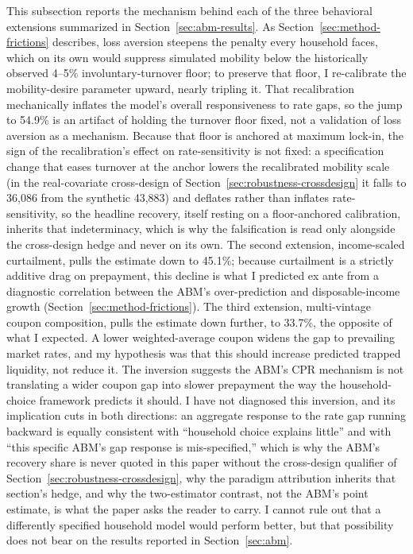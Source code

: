 \documentclass[12pt]{article}
\begin{document}
This subsection reports the mechanism behind each of the three behavioral extensions summarized in Section~\ref{sec:abm-results}. As Section~\ref{sec:method-frictions} describes, loss aversion steepens the penalty every household faces, which on its own would suppress simulated mobility below the historically observed 4--5\% involuntary-turnover floor; to preserve that floor, I re-calibrate the mobility-desire parameter upward, nearly tripling it. That recalibration mechanically inflates the model's overall responsiveness to rate gaps, so the jump to 54.9\% is an artifact of holding the turnover floor fixed, not a validation of loss aversion as a mechanism. Because that floor is anchored at maximum lock-in, the sign of the recalibration's effect on rate-sensitivity is not fixed: a specification change that eases turnover at the anchor lowers the recalibrated mobility scale (in the real-covariate cross-design of Section~\ref{sec:robustness-crossdesign} it falls to 36,086 from the synthetic 43,883) and deflates rather than inflates rate-sensitivity, so the headline recovery, itself resting on a floor-anchored calibration, inherits that indeterminacy, which is why the falsification is read only alongside the cross-design hedge and never on its own. The second extension, income-scaled curtailment, pulls the estimate down to 45.1\%; because curtailment is a strictly additive drag on prepayment, this decline is what I predicted ex ante from a diagnostic correlation between the ABM's over-prediction and disposable-income growth (Section~\ref{sec:method-frictions}). The third extension, multi-vintage coupon composition, pulls the estimate down further, to 33.7\%, the opposite of what I expected. A lower weighted-average coupon widens the gap to prevailing market rates, and my hypothesis was that this should increase predicted trapped liquidity, not reduce it. The inversion suggests the ABM's CPR mechanism is not translating a wider coupon gap into slower prepayment the way the household-choice framework predicts it should. I have not diagnosed this inversion, and its implication cuts in both directions: an aggregate response to the rate gap running backward is equally consistent with ``household choice explains little'' and with ``this specific ABM's gap response is mis-specified,'' which is why the ABM's recovery share is never quoted in this paper without the cross-design qualifier of Section~\ref{sec:robustness-crossdesign}, why the paradigm attribution inherits that section's hedge, and why the two-estimator contrast, not the ABM's point estimate, is what the paper asks the reader to carry. I cannot rule out that a differently specified household model would perform better, but that possibility does not bear on the results reported in Section~\ref{sec:abm}.
\end{document}
